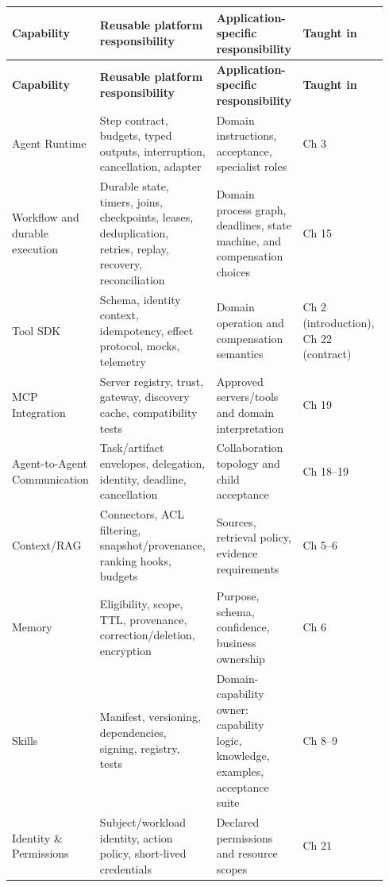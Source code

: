 \BookTableStart
\fontsize{7.2}{9}\selectfont
\begin{longtable}{@{}Y{0.2350\linewidth}Y{0.2350\linewidth}Y{0.2350\linewidth}Y{0.2350\linewidth}@{}}
\color{white}\bfseries \textbf{Capability} & \color{white}\bfseries \textbf{Reusable platform responsibility} & \color{white}\bfseries \textbf{Application-specific responsibility} & \color{white}\bfseries \textbf{Taught in} \\
\endfirsthead
{}
\color{white}\bfseries \textbf{Capability} & \color{white}\bfseries \textbf{Reusable platform responsibility} & \color{white}\bfseries \textbf{Application-specific responsibility} & \color{white}\bfseries \textbf{Taught in} \\
\endhead
Agent Runtime & Step contract, budgets, typed outputs, interruption, cancellation, adapter & Domain instructions, acceptance, specialist roles & Ch 3 \\
Workflow and durable execution & Durable state, timers, joins, checkpoints, leases, deduplication, retries, replay, recovery, reconciliation & Domain process graph, deadlines, state machine, and compensation choices & Ch 15 \\
Tool SDK & Schema, identity context, idempotency, effect protocol, mocks, telemetry & Domain operation and compensation semantics & Ch 2 (introduction), Ch 22 (contract) \\
MCP Integration & Server registry, trust, gateway, discovery cache, compatibility tests & Approved servers/tools and domain interpretation & Ch 19 \\
Agent-to-Agent Communication & Task/artifact envelopes, delegation, identity, deadline, cancellation & Collaboration topology and child acceptance & Ch 18–19 \\
Context/RAG & Connectors, ACL filtering, snapshot/provenance, ranking hooks, budgets & Sources, retrieval policy, evidence requirements & Ch 5–6 \\
Memory & Eligibility, scope, TTL, provenance, correction/deletion, encryption & Purpose, schema, confidence, business ownership & Ch 6 \\
Skills & Manifest, versioning, dependencies, signing, registry, tests & Domain-capability owner: capability logic, knowledge, examples, acceptance suite & Ch 8–9 \\
Identity \& Permissions & Subject/workload identity, action policy, short-lived credentials & Declared permissions and resource scopes & Ch 21 \\

\end{longtable}
